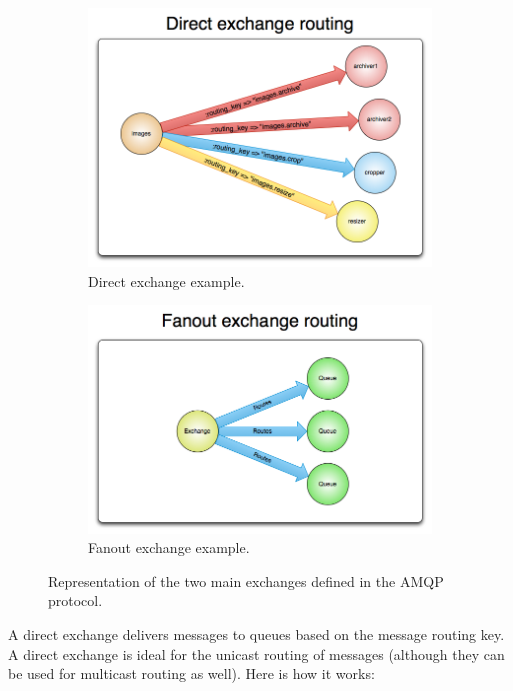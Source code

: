 \begin{figure}
	\centering
	\begin{subfigure}{.45\textwidth}
		\centering
		\includegraphics[width=0.84\linewidth]{figures/exchange-direct.png}
		\caption{Direct exchange example.}
		\label{fig:direc-exchange}
	\end{subfigure}
	\begin{subfigure}{.45\textwidth}
		\centering
		\includegraphics[width=\linewidth]{figures/exchange-fanout.png}
		\caption{Fanout exchange example.}
		\label{fig:fanout-exchange}
	\end{subfigure}
	\caption{Representation of the two main exchanges defined in the AMQP protocol.}
	\label{fig:amqp-exhange-type}
\end{figure}

A direct exchange delivers messages to queues based on the message routing key. A direct exchange is ideal for the unicast routing of messages (although they can be used for multicast routing as well). Here is how it works:

